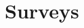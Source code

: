 \documentclass[fleqn,moreauthors,10pt]{ds_report}
\begin{document}


\section*{Surveys}

\end{document}
